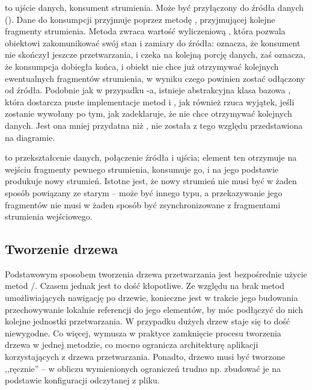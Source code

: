  to ujście danych, konsument strumienia. Może być przyłączony do źródła danych
(). Dane do konsumpcji przyjmuje poprzez metodę , przyjmującej kolejne
fragmenty strumienia. Metoda  zwraca wartość wyliczeniową , która pozwala
obiektowi zakomunikować swój stan i zamiary do źródła:  oznacza, że konsument nie
skończył jeszcze przetwarzania, i czeka na kolejną porcję danych, zaś  oznacza, że
konsumpcja dobiegła końca, i obiekt nie chce już otrzymywać kolejnych ewentualnych fragmentów
strumienia, w wyniku czego powinien zostać odłączony od źródła. Podobnie jak w przypadku
-a, istnieje abstrakcyjna klasa bazowa , która dostarcza
puste implementacje metod  i , jak również rzuca wyjątek, jeśli
 zostanie wywołany po tym, jak  zadeklaruje, że nie chce otrzymywać
kolejnych danych. Jest ona mniej przydatna niż , nie została z tego względu
przedstawiona na diagramie.

 to przekształcenie danych, połączenie źródła i ujścia; element ten otrzymuje na
wejściu fragmenty pewnego strumienia, konsumuje go, i na jego podstawie produkuje nowy strumień.
Istotne jest, że nowy strumień nie musi być w żaden sposób powiązany ze starym -- może być innego
typu, a przekazywanie jego fragmentów nie musi w żaden sposób być zsynchronizowane z fragmentami
strumienia wejściowego. 


\subsection{Tworzenie drzewa}

Podstawowym sposobem tworzenia drzewa przetwarzania jest bezpośrednie użycie metod
\slash {}. Czasem jednak jest to dość kłopotliwe. Ze względu na brak
metod umożliwiających nawigację po drzewie, konieczne jest w trakcie jego budowania przechowywanie
lokalnie referencji do jego elementów, by móc podłączyć do nich kolejne jednostki przetwarzania. W
przypadku dużych drzew staje się to dość niewygodne. Co więcej, wymusza w praktyce zamknięcie
procesu tworzenia drzewa w jednej metodzie, co mocno ogranicza architekturę aplikacji korzystających
z drzewa przetwarzania. Ponadto, drzewo musi być tworzone ,,ręcznie'' -- w obliczu wymienionych
ograniczeń trudno np. zbudować je na podstawie konfiguracji odczytanej z pliku. 

